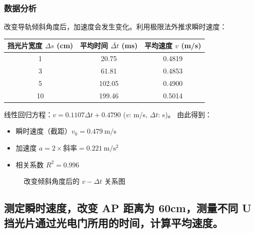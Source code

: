 \documentclass[11pt]{article}
\begin{document}
\subsubsection{数据分析}
改变导轨倾斜角度后，加速度会发生变化。利用极限法外推求瞬时速度：
\begin{table}[H]
    \centering
    \begin{tabular}{ccc}
        \toprule
        挡光片宽度 $\Delta s$ (cm) & 平均时间 $\bar{\Delta t}$ (ms) & 平均速度 $v$ (m/s) \\
        \midrule
        1 & 20.75 & 0.4819 \\
        3 & 61.81 & 0.4853 \\
        5 & 102.05 & 0.4900 \\
        10 & 199.46 & 0.5014 \\
        \bottomrule
    \end{tabular}
\end{table}

线性回归方程：$v = 0.1107 \Delta t + 0.4790$ ($v$: m/s, $\Delta t$: s)。
由此得到：
\begin{itemize}
    \item 瞬时速度（截距）$v_0 = 0.479\ \mathrm{m/s}$
    \item 加速度 $a = 2 \times \text{斜率} = 0.221\ \mathrm{m/s^2}$
    \item 相关系数 $R^2 = 0.996$
\end{itemize}

\begin{figure}[H]
    \centering
    \caption{改变倾斜角度后的 $v-\Delta t$ 关系图}
\end{figure}

\subsection{测定瞬时速度，改变 AP 距离为 60cm，测量不同 U 挡光片通过光电门所用的时间，计算平均速度。}
\end{document}
